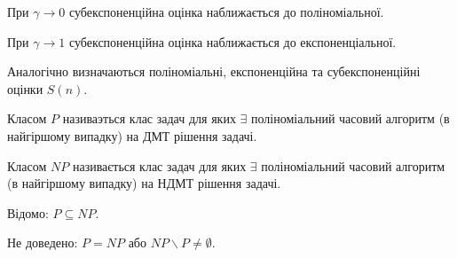 При $\gamma \to 0$ субекспоненційна оцінка наближається до поліноміальної.

При $\gamma \to 1$ субекспоненційна оцінка наближається до експоненціальної.

Аналогічно визначаються поліноміальні, експоненційна та субекспоненційні оцінки $S(n)$.

 \begin{mydef}Класом $P$ називаэться клас задач для яких $\exists$ поліноміальний часовий алгоритм (в найгіршому випадку) на ДМТ рішення задачі. \end{mydef}

 \begin{mydef}Класом $NP$ називається клас задач для яких $\exists$ поліноміальний часовий алгоритм (в найгіршому випадку) на НДМТ рішення задачі. \end{mydef}

Відомо: $P \subseteq NP.$

Не доведено: $ P = NP$ або $NP \backslash P \ne \emptyset$.
